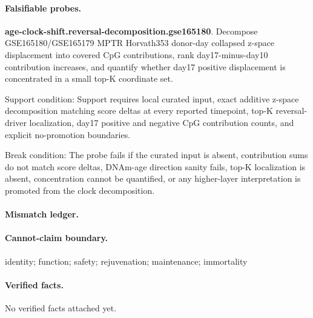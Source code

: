 \paragraph{Falsifiable probes.}
\textbf{age-clock-shift.reversal-decomposition.gse165180}. Decompose GSE165180/GSE165179 MPTR Horvath353 donor-day collapsed z-space displacement into covered CpG contributions, rank day17-minus-day10 contribution increases, and quantify whether day17 positive displacement is concentrated in a small top-K coordinate set.

Support condition: Support requires local curated input, exact additive z-space decomposition matching score deltas at every reported timepoint, top-K reversal-driver localization, day17 positive and negative CpG contribution counts, and explicit no-promotion boundaries.

Break condition: The probe fails if the curated input is absent, contribution sums do not match score deltas, DNAm-age direction sanity fails, top-K localization is absent, concentration cannot be quantified, or any higher-layer interpretation is promoted from the clock decomposition.

\paragraph{Mismatch ledger.}
\paragraph{Cannot-claim boundary.} identity; function; safety; rejuvenation; maintenance; immortality

\paragraph{Verified facts.}
No verified facts attached yet.
